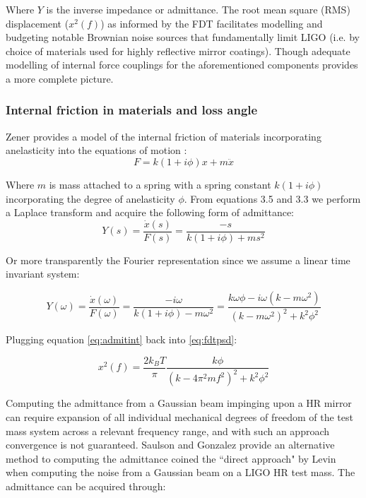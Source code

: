 \noindent Where $Y$ is the inverse impedance or admittance. The root mean square (RMS) displacement ($x^2(f)$) as informed by the FDT facilitates modelling and budgeting notable Brownian noise sources that fundamentally limit LIGO (i.e. by choice of materials used for highly reflective mirror coatings). Though adequate modelling of internal force couplings for the aforementioned components provides a more complete picture.

\subsubsection*{Internal friction in materials and loss angle}
Zener provides a model of the internal friction of materials incorporating anelasticity into the equations of motion \cite{zener:1948}:
\begin{equation}
F = k(1+i\phi)x + m\ddot{x}
\end{equation}

\noindent Where $m$ is mass attached to a spring with a spring constant $k(1+ i\phi)$ incorporating the degree of anelasticity $\phi$. From equations 3.5 and 3.3 we perform a Laplace transform and acquire the following form of admittance:
\begin{equation}
Y(s) = \frac{\dot{x}(s)}{F(s)} = \frac{-s}{k(1+i\phi) + ms^2}
\end{equation}

\noindent Or more transparently the Fourier representation since we assume a linear time invariant system:

\begin{equation}\label{eq:admitint}
Y(\omega) = \frac{\dot{x}(\omega)}{F(\omega)} = \frac{-i\omega}{k(1+i\phi) - m\omega^2} = \frac{k \omega \phi - i \omega (k - m \omega^2)}{(k-m\omega^2)^2 +k^2 \phi^2}
\end{equation}

\noindent Plugging equation \autoref{eq:admitint} back into \autoref{eq:fdtpsd}:

\begin{equation}
x^2 (f)  = \frac{2k_B T}{\pi}\frac{k\phi}{(k-4\pi^2 m f^2)^2 + k^2 \phi^2}
\end{equation}

Computing the admittance from a Gaussian beam impinging upon a HR mirror can require expansion of all individual mechanical degrees of freedom of the test mass system across a relevant frequency range, and with such an approach convergence is not guaranteed. Saulson and Gonzalez provide an alternative method to computing the admittance coined the ``direct approach" by Levin when computing the noise from a Gaussian beam on a LIGO HR test mass. The admittance can be acquired through:

